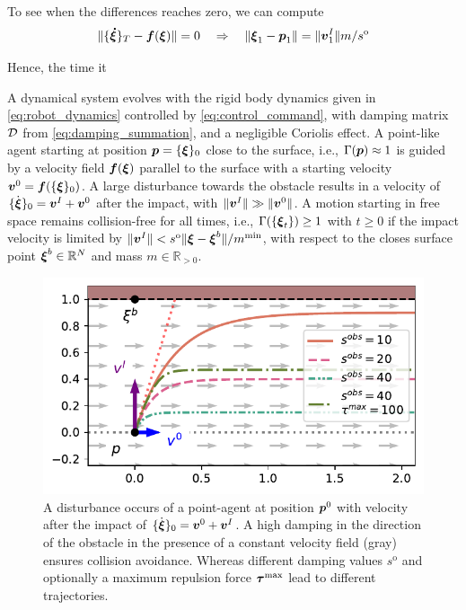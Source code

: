 To see when the differences reaches zero, we can compute
\begin{equation}
 \|	\{ \boldsymbol{\dot \xi} \}_T - \boldsymbol{f}(\boldsymbol{\xi}) \| = 0
 \quad \Rightarrow \quad
    \| \boldsymbol{\xi}_1 -  \boldsymbol{p}_1 \| = \| \boldsymbol{v}^I_1 \| {m} / {s^{\mathrm{o}}} 
 \end{equation}

Hence, the time it  



\begin{lemma}
	A dynamical system evolves with the rigid body dynamics given in \eqref{eq:robot_dynamics} controlled by \eqref{eq:control_command}, with damping matrix $\mathcal{D}$ from \eqref{eq:damping_summation}, and a negligible Coriolis effect.
    A point-like agent starting at position $\boldsymbol{p} = \{{\boldsymbol{\xi}}\}_0$ close to the surface, i.e., $\Gamma( \boldsymbol{p}) \approx 1$ is guided by a velocity field $\boldsymbol{f}(\boldsymbol{\xi})$ parallel to the surface with a starting velocity $\boldsymbol{v}^0= \boldsymbol{f}(\{{\boldsymbol{\xi}}\}_0)$.
    A large disturbance towards the obstacle results in a velocity of $\{\dot{\boldsymbol{\xi}}\}_0 = \boldsymbol{v}^I +  \boldsymbol{v}^0$ after the impact, with $\| \boldsymbol{v}^I \| \gg \| \boldsymbol{v}^0 \|$.
	A motion starting in free space remains collision-free for all times, i.e., $\Gamma( \{\boldsymbol{\xi}_t\}) \geq 1$ with $t \geq 0$ if the impact velocity is limited by $\| \boldsymbol{v}^I\| < s^{\mathrm{o}} \| \boldsymbol{\xi} - \boldsymbol{\xi}^b \| / m^{\mathrm{min}}$, with respect to the closes surface point $\boldsymbol{\xi}^b \in \mathbb{R}^N$ and mass $m \in \mathbb{R}_{>0}$.
\end{lemma}


\begin{figure}[htb]
\centering
  \centerline{\includegraphics[width=0.99\columnwidth]{figures/parallel_avoidance_obstacle}}
  \caption{A disturbance occurs of a point-agent at position $\boldsymbol{p}^0$ with velocity after the impact of $\{ \dot{\boldsymbol{\xi}} \}_0 = \boldsymbol{v}^0 + \boldsymbol{v}^I$. A high damping in the direction of the obstacle in the presence of a constant velocity field (gray) ensures collision avoidance. Whereas different damping values $s^{\mathrm{o}}$ and optionally a maximum repulsion force $\boldsymbol{\tau}^{\mathrm{max}}$ lead to different trajectories.}
  \label{fig:disturbance_with_parallel_velocity}
\end{figure}
    
